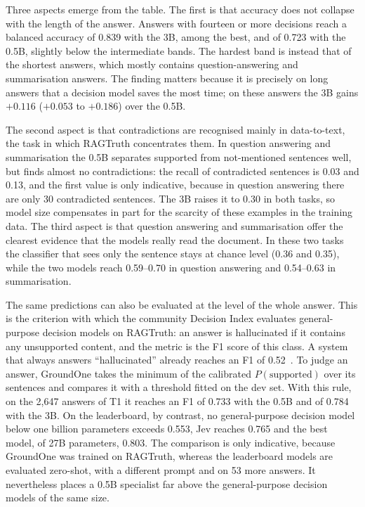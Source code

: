 Three aspects emerge from the table. The first is that accuracy does not collapse with the length of the answer. Answers
with fourteen or more decisions reach a balanced accuracy of 0.839 with the 3B, among the best, and of 0.723 with the
0.5B, slightly below the intermediate bands. The hardest band is instead that of the shortest answers, which mostly
contains question-answering and summarisation answers. The finding matters because it is precisely on long answers that
a decision model saves the most time; on these answers the 3B gains $+0.116$ ($+0.053$ to $+0.186$) over the 0.5B.

The second aspect is that contradictions are recognised mainly in data-to-text, the task in which RAGTruth concentrates
them. In question answering and summarisation the 0.5B separates supported from not-mentioned sentences well, but finds
almost no contradictions: the recall of contradicted sentences is 0.03 and 0.13, and the first value is only
indicative, because in question answering there are only 30 contradicted sentences. The 3B raises it to 0.30 in
both tasks, so model size compensates in part for the scarcity of these examples in the training data. The third aspect
is that question answering and summarisation offer the clearest evidence that the models really read the document. In
these two tasks the classifier that sees only the sentence stays at chance level (0.36 and 0.35), while the two models
reach 0.59--0.70 in question answering and 0.54--0.63 in summarisation.

The same predictions can also be evaluated at the level of the whole answer. This is the criterion with which the
community Decision Index evaluates general-purpose decision models on RAGTruth: an answer is hallucinated if it contains
any unsupported content, and the metric is the F1 score of this class. A system that always answers ``hallucinated''
already reaches an F1 of 0.52~\cite{decisionindex2026}. To judge an answer, GroundOne takes the minimum of the
calibrated $P(\text{supported})$ over its sentences and compares it with a threshold fitted on the dev set. With this
rule, on the 2{,}647 answers of T1 it reaches an F1 of 0.733 with the 0.5B and of 0.784 with the 3B. On the leaderboard,
by contrast, no general-purpose decision model below one billion parameters exceeds 0.553, Jev reaches 0.765 and the
best model, of 27B parameters, 0.803. The comparison is only indicative, because GroundOne was trained on RAGTruth,
whereas the leaderboard models are evaluated zero-shot, with a different prompt and on 53 more answers. It nevertheless
places a 0.5B specialist far above the general-purpose decision models of the same size.

